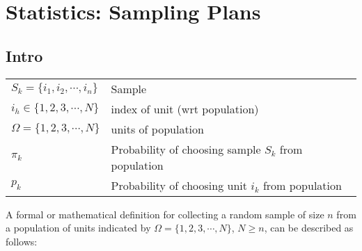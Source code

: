 \chapter{Statistics: Sampling Plans \cite{ism-1}}

\section*{Intro \cite{ism-1}}

\begin{longtable}{p{4cm} p{10cm}}
    $S_k = \{i_1,i_2,\cdots,i_n\}$ & Sample \\

    $i_h \in \{1, 2, 3,\cdots, N\}$ & index of unit (wrt population) \\

    $\Omega = \{1, 2, 3, \cdots, N\}$ & units of population \\

    $\pi_k$ & Probability of choosing sample $S_k$ from population\\

    $p_k$ & Probability of choosing unit $i_k$ from population\\
\end{longtable}

A formal or mathematical definition for collecting a random sample of size $n$ from a population of units indicated by $\Omega = \{1, 2, 3, \cdots, N\}$, $N \geq n$, can be described as follows:

